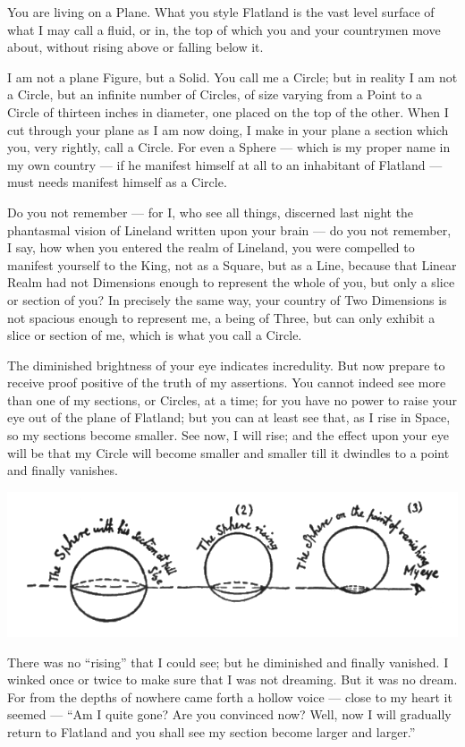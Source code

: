 \documentclass[12pt, a4paper, oneside]{memoir}
\begin{document}
You are living on a Plane. What you style Flatland is the vast level surface
of what I may call a fluid, or in, the top of which you and your countrymen
move about, without rising above or falling below it.

I am not a plane Figure, but a Solid. You call me a Circle; but in reality I
am not a Circle, but an infinite number of Circles, of size varying from a
Point to a Circle of thirteen inches in diameter, one placed on the top of the
other. When I cut through your plane as I am now doing, I make in your plane a
section which you, very rightly, call a Circle. For even a Sphere --- which is
my proper name in my own country --- if he manifest himself at all to an
inhabitant of Flatland --- must needs manifest himself as a Circle.

Do you not remember --- for I, who see all things, discerned last night the
phantasmal vision of Lineland written upon your brain --- do you not remember, I
say, how when you entered the realm of Lineland, you were compelled to
manifest yourself to the King, not as a Square, but as a Line, because that
Linear Realm had not Dimensions enough to represent the whole of you, but only
a slice or section of you? In precisely the same way, your country of Two
Dimensions is not spacious enough to represent me, a being of Three, but can
only exhibit a slice or section of me, which is what you call a Circle.

The diminished brightness of your eye indicates incredulity. But now prepare
to receive proof positive of the truth of my assertions. You cannot indeed see
more than one of my sections, or Circles, at a time; for you have no power to
raise your eye out of the plane of Flatland; but you can at least see that, as
I rise in Space, so my sections become smaller. See now, I will rise; and the
effect upon your eye will be that my Circle will become smaller and smaller
till it dwindles to a point and finally vanishes.

\includegraphics[trim=20mm 0mm 0mm 0mm,width=\linewidth]{fig8}

There was no ``rising'' that I could see; but he diminished and finally
vanished. I winked once or twice to make sure that I was not dreaming. But it
was no dream. For from the depths of nowhere came forth a hollow voice --- close
to my heart it seemed --- ``Am I quite gone? Are you convinced now? Well, now I
will gradually return to Flatland and you shall see my section become larger
and larger.''
\end{document}
